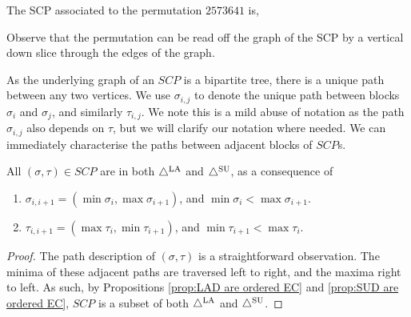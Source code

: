 \begin{example}\label{ex:strong-complementary}
The SCP associated to the permutation $2573641$ is,
\begin{center}
\end{center}
Observe that the permutation can be read off the graph of the SCP by a vertical down slice through the edges of the graph.
\end{example}
As the underlying graph of an $SCP$ is a bipartite tree, there is a unique path between any two vertices. We use $\sigma_{i,j}$ to denote the unique path between blocks $\sigma_{i}$ and $\sigma_j$, and similarly $\tau_{i,j}$. We note this is a mild abuse of notation as the path $\sigma_{i,j}$ also depends on $\tau$, but we will clarify our notation where needed.  We can immediately characterise the paths between adjacent blocks of $SCP$s.
\begin{lemma} \label{lem: SCP path desc}
All $(\sigma,\tau)\in SCP$ are in both $\triangle^{\mathrm{LA}}$ and $\triangle^{\mathrm{SU}}$, as a consequence of
\begin{enumerate}
    \item $ \sigma_{i,i+1} = ( \min \sigma_i, \max \sigma_{i+1} )$, and $\min \sigma_i< \max \sigma_{i+1}$.
    \item $  \tau_{i,i+1} =  ( \max \tau_i, \min \tau_{i+1} )$, and $\min \tau_{i+1}< \max \tau_{i}$.
\end{enumerate}
\end{lemma}
\begin{proof}
The path description of $(\sigma,\tau)$ is a straightforward observation. The minima of these adjacent paths are traversed left to right, and the maxima right to left. As such, by Propositions \ref{prop:LAD are ordered EC} and \ref{prop:SUD are ordered EC}, $SCP$ is a subset of both $\triangle^{\mathrm{LA}}$ and $\triangle^{\mathrm{SU}}$.
\end{proof}


